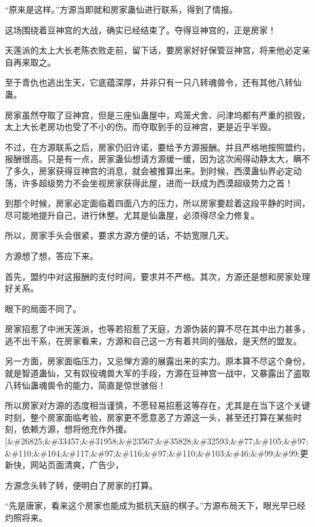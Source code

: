 
\begin{this_body}

“原来是这样。”方源当即就和房家蛊仙进行联系，得到了情报。

这场围绕着豆神宫的大战，确实已经结束了。夺得豆神宫的，正是房家！

天莲派的太上大长老陈衣败走前，留下话，要房家好好保管豆神宫，将来他必定亲自再来取之。

至于青仇也逃出生天，它底蕴深厚，并非只有一只八转魂兽令，还有其他八转仙蛊。

房家虽然夺取了豆神宫，但是三座仙蛊屋中，鸡笼犬舍、问津坞都有严重的损毁，太上大长老房功也受了不小的伤。而夺取到手的豆神宫，更是近乎半毁。

不过，在方源联系之后，房家仍旧许诺，要给予方源报酬。并且严格地按照盟约，报酬很高。只是有一点，房家蛊仙想请方源缓一缓，因为这次闹得动静太大，瞒不了多久，房家获得豆神宫的消息，就会被推算出来。到时候，西漠蛊仙界必定动荡，许多超级势力不会坐视房家获得此屋，进而一跃成为西漠超级势力之首！

到那个时候，房家必定面临着四面八方的压力，所以房家要趁着这段平静的时间，尽可能地提升自己，进行休整。尤其是仙蛊屋，必须得尽全力修复。

所以，房家手头会很紧，要求方源方便的话，不妨宽限几天。

方源想了想，答应下来。

首先，盟约中对这报酬的支付时间，要求并不严格。其次，方源还是想和房家处理好关系。

眼下的局面不同了。

房家招惹了中洲天莲派，也等若招惹了天庭，方源伪装的算不尽在其中出力甚多，逃不出干系，在房家看来，方源和自己这一方有着共同的强敌，是天然的盟友。

另一方面，房家面临压力，又忌惮方源的展露出来的实力。原本算不尽这个身份，就是智道蛊仙，又有奴役魂兽大军的手段，方源在豆神宫一战中，又暴露出了盗取八转仙蛊魂兽令的能力，简直是惊世骇俗！

所以房家对方源的态度相当谨慎，不愿轻易招惹这等存在，尤其是在当下这个关键时刻，整个房家面临考验，房家更不愿意恶了方源这一头，甚至还打算在某些时刻，依赖方源，想将他充作外援。[\&\#26825;\&\#33457;\&\#31958;\&\#23567;\&\#35828;\&\#32593;\&\#77;\&\#105;\&\#97;\&\#110;\&\#104;\&\#117;\&\#97;\&\#116;\&\#97;\&\#110;\&\#103;\&\#46;\&\#99;\&\#99;更新快，网站页面清爽，广告少，

方源念头转了转，便明白了房家的打算。

“先是唐家，看来这个房家也能成为抵抗天庭的棋子。”方源布局天下，眼光早已经灼照将来。


\end{this_body}
